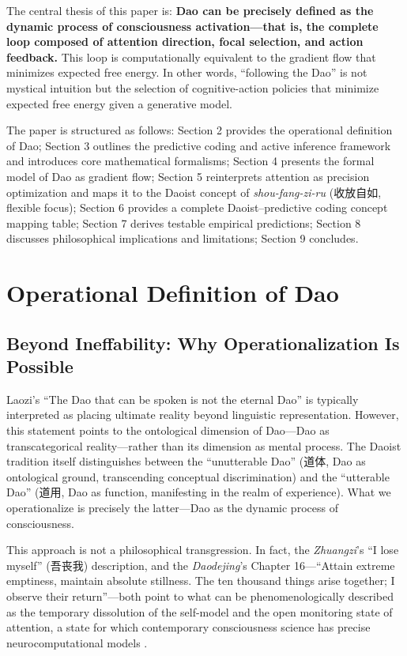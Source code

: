 \documentclass[11pt,a4paper]{article}
\begin{document}
The central thesis of this paper is: \textbf{Dao can be precisely defined as the dynamic process of consciousness activation---that is, the complete loop composed of attention direction, focal selection, and action feedback.} This loop is computationally equivalent to the gradient flow that minimizes expected free energy. In other words, ``following the Dao'' is not mystical intuition but the selection of cognitive-action policies that minimize expected free energy given a generative model.

The paper is structured as follows: Section 2 provides the operational definition of Dao; Section 3 outlines the predictive coding and active inference framework and introduces core mathematical formalisms; Section 4 presents the formal model of Dao as gradient flow; Section 5 reinterprets attention as precision optimization and maps it to the Daoist concept of \textit{shou-fang-zi-ru} (收放自如, flexible focus); Section 6 provides a complete Daoist--predictive coding concept mapping table; Section 7 derives testable empirical predictions; Section 8 discusses philosophical implications and limitations; Section 9 concludes.

\section{Operational Definition of Dao}

\subsection{Beyond Ineffability: Why Operationalization Is Possible}

Laozi's ``The Dao that can be spoken is not the eternal Dao'' is typically interpreted as placing ultimate reality beyond linguistic representation. However, this statement points to the ontological dimension of Dao---Dao as transcategorical reality---rather than its dimension as mental process. The Daoist tradition itself distinguishes between the ``unutterable Dao'' (道体, Dao as ontological ground, transcending conceptual discrimination) and the ``utterable Dao'' (道用, Dao as function, manifesting in the realm of experience). What we operationalize is precisely the latter---Dao as the dynamic process of consciousness.

This approach is not a philosophical transgression. In fact, the \textit{Zhuangzi}'s ``I lose myself'' (吾丧我) description, and the \textit{Daodejing}'s Chapter 16---``Attain extreme emptiness, maintain absolute stillness. The ten thousand things arise together; I observe their return''---both point to what can be phenomenologically described as the temporary dissolution of the self-model and the open monitoring state of attention, a state for which contemporary consciousness science has precise neurocomputational models \cite{Seth2021,Lutz2008}.
\end{document}
